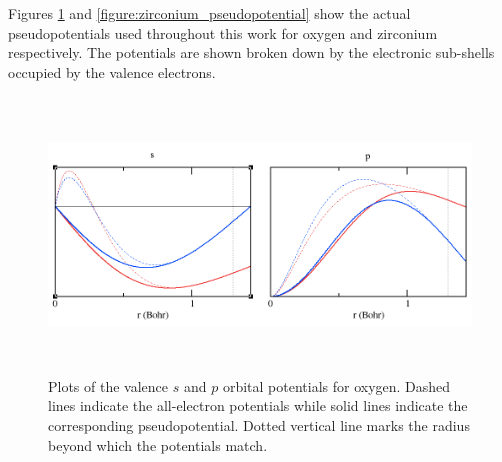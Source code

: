 Figures \ref{figure:oxygen_pseudopotential} and \ref{figure:zirconium_pseudopotential} show the actual pseudopotentials used throughout this work for oxygen and zirconium respectively. The potentials are shown broken down by the electronic sub-shells occupied by the valence electrons.

\begin{figure} %
\begin{center}
\includegraphics[height=7.3cm]{images/oxygen_otf_pp.png}
\end{center}
\caption{Plots of the valence $s$ and $p$ orbital potentials for oxygen. Dashed lines indicate the all-electron potentials while solid lines indicate the corresponding pseudopotential. Dotted vertical line marks the radius beyond which the potentials match.}
\label{figure:oxygen_pseudopotential}
\end{figure}


